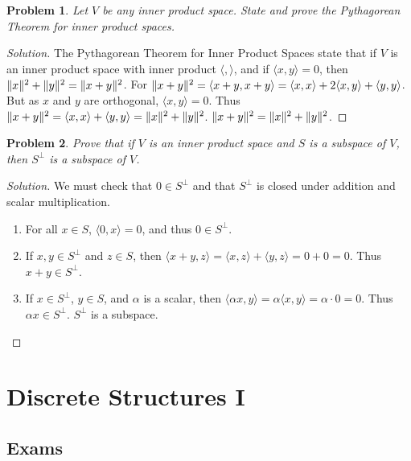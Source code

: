 \documentclass[oneside]{book}
\theoremstyle{mystyle}
\newtheorem{problem}{Problem}[section]
\DeclarePairedDelimiter\norm{\lVert}{\rVert}
\begin{document}
\begin{problem}
Let $V$ be any inner product space. State and prove the Pythagorean Theorem for inner product spaces.
\end{problem}
\begin{proof}[Solution]
The Pythagorean Theorem for Inner Product Spaces state that if $V$ is an inner product space with inner product $\langle, \rangle$, and if $\langle x,y\rangle = 0$, then $\norm{x}^2+\norm{y}^2 = \norm{x+y}^2$. For $\norm{x+y}^2 = \langle x+y,x+y\rangle = \langle x,x\rangle + 2\langle x,y\rangle +\langle y,y\rangle$. But as $x$ and $y$ are orthogonal, $\langle x,y \rangle = 0$. Thus $\norm{x+y}^2 = \langle x,x\rangle + \langle y,y\rangle = \norm{x}^2+\norm{y}^2$. $\norm{x+y}^2 =\norm{x}^2+\norm{y}^2$.
\end{proof}
\begin{problem}
Prove that if $V$ is an inner product space and $S$ is a subspace of $V$, then $S^{\perp}$ is a subspace of $V$.
\end{problem}
\begin{proof}[Solution]
We must check that $0\in S^{\perp}$ and that $S^{\perp}$ is closed under addition and scalar multiplication.
\begin{enumerate}
    \item For all $x\in S$, $\langle 0,x \rangle = 0$, and thus $0\in S^{\perp}$.
    \item If $x,y\in S^{\perp}$ and $z\in S$, then $\langle x+y,z\rangle = \langle x,z\rangle + \langle y,z\rangle = 0+0=0$. Thus $x+y\in S^{\perp}$.
    \item If $x\in S^{\perp}$, $y\in S$, and $\alpha$ is a scalar, then $\langle \alpha x,y \rangle = \alpha \langle x,y \rangle = \alpha \cdot 0 = 0$. Thus $\alpha x \in S^{\perp}$. $S^{\perp}$ is a subspace.
\end{enumerate}
\end{proof}
\chapter{Discrete Structures I}
\section{Exams}
\end{document}
